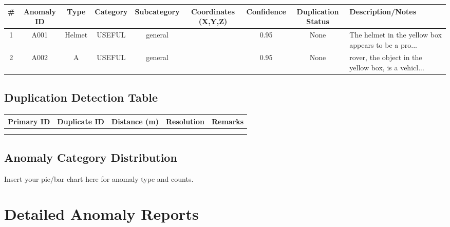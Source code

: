 \documentclass[12pt,a4paper]{report}
\begin{document}
\begin{center}
\begin{tabularx}{\textwidth}{|c|c|c|c|c|c|c|c|X|}
\hline
\textbf{\#} & \textbf{Anomaly ID} & \textbf{Type} & \textbf{Category} & \textbf{Subcategory} & \textbf{Coordinates (X,Y,Z)} & \textbf{Confidence} & \textbf{Duplication Status} & \textbf{Description/Notes} \\
\hline
1 & A001 & Helmet & USEFUL & general &   & 0.95 & None &   The helmet in the yellow box appears to be a pro... \\
\hline
2 & A002 & A & USEFUL & general &   & 0.95 & None &   rover, the object in the yellow box, is a vehicl... \\
\hline

\end{tabularx}
\end{center}

\section{Duplication Detection Table}
\begin{center}
\begin{tabularx}{0.8\textwidth}{|c|c|c|c|X|}
\hline
\textbf{Primary ID} & \textbf{Duplicate ID} & \textbf{Distance (m)} & \textbf{Resolution} & \textbf{Remarks} \\
\hline
 & & & & \\
 & & & & \\
\hline
\end{tabularx}
\end{center}

\section{Anomaly Category Distribution}
\vspace{0.5em}
Insert your pie/bar chart here for anomaly type and counts.\\
\begin{center}
\end{center}


\chapter{Detailed Anomaly Reports}
\end{document}
